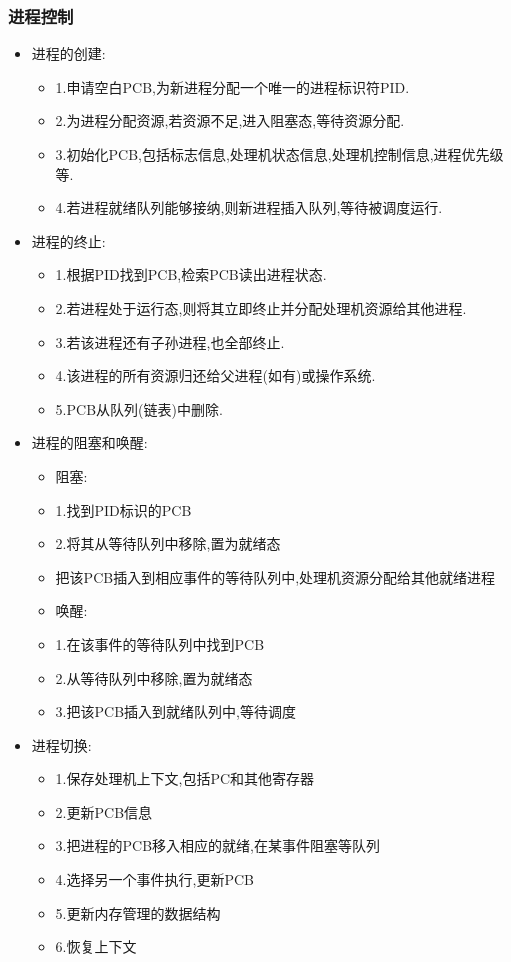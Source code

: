 \documentclass{ctexart}
\begin{document}
\subsubsection{进程控制}
\begin{itemize}
	\item 进程的创建:
	      \begin{itemize}
		      \item 1.申请空白PCB,为新进程分配一个唯一的进程标识符PID.
		      \item 2.为进程分配资源,若资源不足,进入阻塞态,等待资源分配.
		      \item 3.初始化PCB,包括标志信息,处理机状态信息,处理机控制信息,进程优先级等.
		      \item 4.若进程就绪队列能够接纳,则新进程插入队列,等待被调度运行.
	      \end{itemize}
	\item 进程的终止:
	      \begin{itemize}
		      \item 1.根据PID找到PCB,检索PCB读出进程状态.
		      \item 2.若进程处于运行态,则将其立即终止并分配处理机资源给其他进程.
		      \item 3.若该进程还有子孙进程,也全部终止.
		      \item 4.该进程的所有资源归还给父进程(如有)或操作系统.
		      \item 5.PCB从队列(链表)中删除.
	      \end{itemize}
	\item 进程的阻塞和唤醒:\\
	      \begin{itemize}
		      \item 阻塞:
		      \item 1.找到PID标识的PCB
		      \item 2.将其从等待队列中移除,置为就绪态
		      \item 把该PCB插入到相应事件的等待队列中,处理机资源分配给其他就绪进程
		      \item 唤醒:
		      \item 1.在该事件的等待队列中找到PCB
		      \item 2.从等待队列中移除,置为就绪态
		      \item 3.把该PCB插入到就绪队列中,等待调度
	      \end{itemize}
	\item 进程切换:\\
	      \begin{itemize}
		      \item 1.保存处理机上下文,包括PC和其他寄存器
		      \item 2.更新PCB信息
		      \item 3.把进程的PCB移入相应的就绪,在某事件阻塞等队列
		      \item 4.选择另一个事件执行,更新PCB
		      \item 5.更新内存管理的数据结构
		      \item 6.恢复上下文
	      \end{itemize}
\end{itemize}
\end{document}

